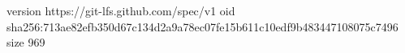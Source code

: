 version https://git-lfs.github.com/spec/v1
oid sha256:713ae82efb350d67c134d2a9a78ec07fe15b611c10edf9b483447108075c7496
size 969
